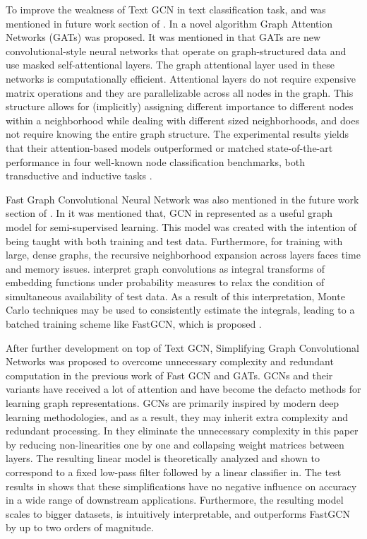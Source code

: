 To improve the weakness of Text GCN in text classification task, \autocite{velickovic18graph} and \autocite{fastGCN2018} was mentioned in future work section of \autocite{yao18graph}. In \autocite{velickovic18graph} a novel algorithm Graph Attention Networks (GATs) was proposed. It was mentioned in \autocite{velickovic18graph} that GATs are new convolutional-style neural networks that operate on graph-structured data and use masked self-attentional layers. The graph attentional layer used in these networks is computationally efficient. Attentional layers do not require expensive matrix operations and they are parallelizable across all nodes in the graph. This structure allows for (implicitly) assigning different importance to different nodes within a neighborhood while dealing with different sized neighborhoods, and does not require knowing the entire graph structure. The experimental results yields that their attention-based models outperformed or matched state-of-the-art performance in four well-known node classification benchmarks, both transductive and inductive tasks \autocite{velickovic18graph}.

Fast Graph Convolutional Neural Network \autocite{fastGCN2018} was also mentioned in the future work section of \autocite{yao18graph}. In \autocite{fastGCN2018} it was mentioned that, GCN in \autocite{kipf17semisupervised} represented as a useful graph model for semi-supervised learning. This model was created with the intention of being taught with both training and test data. Furthermore, for training with large, dense graphs, the recursive neighborhood expansion across layers faces time and memory issues. \autocite{fastGCN2018} interpret graph convolutions as integral transforms of embedding functions under probability measures to relax the condition of simultaneous availability of test data. As a result of this interpretation, Monte Carlo techniques may be used to consistently estimate the integrals, leading to a batched training scheme like FastGCN, which is proposed \cite{fastGCN2018}.

After further development on top of Text GCN, Simplifying Graph Convolutional Networks \cite{simplfyingGCN2019} was proposed to overcome unnecessary complexity and redundant computation in the previous work of Fast GCN and GATs. GCNs and their variants have received a lot of attention and have become the defacto methods for learning graph representations. GCNs are primarily inspired by modern deep learning methodologies, and as a result, they may inherit extra complexity and redundant processing. In \autocite{simplfyingGCN2019} they eliminate the unnecessary complexity in this paper by reducing non-linearities one by one and collapsing weight matrices between layers. The resulting linear model is theoretically analyzed and shown to correspond to a fixed low-pass filter followed by a linear classifier in. The test results in \autocite{simplfyingGCN2019} shows that these simplifications have no negative influence on accuracy in a wide range of downstream applications. Furthermore, the resulting model scales to bigger datasets, is intuitively interpretable, and outperforms FastGCN by up to two orders of magnitude.


